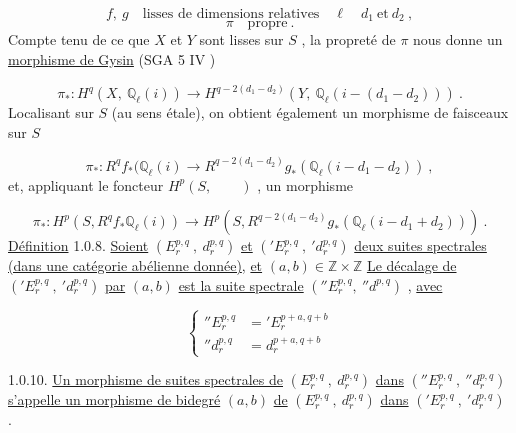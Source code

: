 
\begin{equation}\tag{1.0.3}
f,\ g \quad \text{lisses de dimensions relatives} \quad \ell \quad d_1 \ \text{et} \ d_2 \ ,
\end{equation}
\begin{equation}\tag{1.0.4}
\pi \quad \text{propre} \ .
\end{equation}
Compte tenu de ce que $X$ et $Y$ sont lisses sur $S$ , la propreté de $\pi$ nous donne un \underline{morphisme de Gysin} (SGA 5 IV \qquad )

\begin{equation}\tag{1.0.5}
\pi_* : H^q(X,\ \mathbb{Q}_\ell(i)) \longrightarrow H^{q-2(d_1-d_2)}(Y,\ \mathbb{Q}_\ell(i-(d_1-d_2))) \ .
\end{equation}
Localisant sur $S$ (au sens étale), on obtient également un morphisme de faisceaux sur $S$

\begin{equation}\tag{1.0.6}
\pi_* : R^q f_*(\mathbb{Q}_\ell(i) \longrightarrow R^{q-2(d_1-d_2)} g_*(\mathbb{Q}_\ell(i-d_1-d_2)) \ ,
\end{equation}
et, appliquant le foncteur $H^p(S, \qquad )$ , un morphisme

\begin{equation}\tag{1.0.7}
\pi_*: H^p(S,R^q f_*\mathbb{Q}_\ell(i)) \longrightarrow H^p(S,R^{q-2(d_1-d_2)} g_*(\mathbb{Q}_\ell(i-d_1+d_2))) \ .
\end{equation}
\underline{Définition} 1.0.8. \underline{Soient} $(E_r^{p,q}\ ,\ d_r^{p,q})$ \underline{et} $({}'E_r^{p,q}\ ,\ {}'d_r^{p,q})$ \underline{deux suites spectrales (dans une catégorie abélienne donnée)}, \underline{et} $(a, b) \in \mathbb{Z} \times \mathbb{Z}$ \underline{Le décalage de} $({}'E_r^{p,q}\ ,\ {}'d_r^{p,q})$ \underline{par} $(a, b)$ \underline{est la suite spectrale} $({}''E_r^{p,q},\ {}''d^{p,q})$ , \underline{avec}

\begin{equation}\tag{1.0.9}
\left\{
\begin{aligned}
{}''E_r^{p,q} &= {}'E_r^{p+a,q+b} \\
{}''d_r^{p,q} &= d_r^{p+a,q+b}
\end{aligned}
\right.
\end{equation}


1.0.10. \underline{Un morphisme de suites spectrales de} $(E_r^{p,q}\ ,\ d_r^{p,q})$ \underline{dans} $({}''E_r^{p,q}\ ,\ {}''d_r^{p,q})$ \underline{s'appelle un morphisme de bidegré} $(a, b)$ \underline{de} $(E_r^{p,q}\ ,\ d_r^{p,q})$ \underline{dans} $({}'E_r^{p,q}\ ,\ {}'d_r^{p,q})$ .


